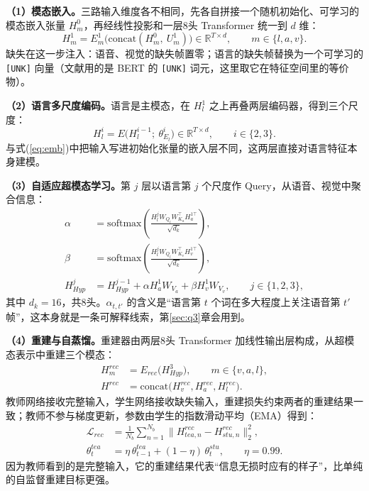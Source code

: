 \textbf{（1）模态嵌入。}三路输入维度各不相同，先各自拼接一个随机初始化、可学习的模态嵌入张量 $H_m^0$，再经线性投影和一层8头 Transformer 统一到 $d$ 维：
\begin{equation}\label{eq:emb}
H_m^1=E_m^1\big(\mathrm{concat}(H_m^0,\ U_m^1)\big)\in\mathbb{R}^{T\times d},\qquad m\in\{l,a,v\}.
\end{equation}
缺失在这一步注入：语音、视觉的缺失帧置零；语言的缺失帧替换为一个可学习的 \texttt{[UNK]} 向量（文献\cite{shi2026ldsd}用的是 BERT 的 \texttt{[UNK]} 词元，这里取它在特征空间里的等价物）。

\textbf{（2）语言多尺度编码。}语言是主模态，在 $H_l^1$ 之上再叠两层编码器，得到三个尺度：
\begin{equation}\label{eq:lang}
H_l^i=E\big(H_l^{i-1};\ \theta_{E_l}^i\big)\in\mathbb{R}^{T\times d},\qquad i\in\{2,3\}.
\end{equation}
与式(\ref{eq:emb})中把输入写进初始化张量的嵌入层不同，这两层直接对语言特征本身建模。

\textbf{（3）自适应超模态学习。}第 $j$ 层以语言第 $j$ 个尺度作 Query，从语音、视觉中聚合信息：
\begin{align}
\alpha&=\mathrm{softmax}\!\left(\frac{H_l^j W_{Q_l} W_{K_a}^{\top} H_a^{1\top}}{\sqrt{d_k}}\right),\label{eq:alpha}\\
\beta&=\mathrm{softmax}\!\left(\frac{H_l^j W_{Q_l} W_{K_v}^{\top} H_v^{1\top}}{\sqrt{d_k}}\right),\label{eq:beta}\\
H_{Hyp}^j&=H_{Hyp}^{j-1}+\alpha H_a^1 W_{V_a}+\beta H_v^1 W_{V_v},\qquad j\in\{1,2,3\},\label{eq:hyp}
\end{align}
其中 $d_k=16$，共8头。$\alpha_{t,t'}$ 的含义是“语言第 $t$ 个词在多大程度上关注语音第 $t'$ 帧”，这本身就是一条可解释线索，第\ref{sec:q3}章会用到。

\textbf{（4）重建与自蒸馏。}重建器由两层8头 Transformer 加线性输出层构成，从超模态表示中重建三个模态：
\begin{align}
H_m^{rec}&=E_{rec}\big(H_{Hyp}^3\big),\qquad m\in\{v,a,l\},\label{eq:rec}\\
H^{rec}&=\mathrm{concat}\big(H_v^{rec},H_a^{rec},H_l^{rec}\big).\label{eq:reccat}
\end{align}
教师网络接收完整输入，学生网络接收缺失输入，重建损失约束两者的重建结果一致；教师不参与梯度更新，参数由学生的指数滑动平均（EMA）得到\cite{tarvainen2017mean}：
\begin{align}
\mathcal{L}_{rec}&=\frac{1}{N_b}\sum_{n=1}^{N_b}\big\|H^{rec}_{tea,n}-H^{rec}_{stu,n}\big\|_2^2,\label{eq:lrec}\\
\theta_t^{tea}&=\eta\,\theta_{t-1}^{tea}+(1-\eta)\,\theta_t^{stu},\qquad \eta=0.99.\label{eq:ema}
\end{align}
因为教师看到的是完整输入，它的重建结果代表“信息无损时应有的样子”，比单纯的自监督重建目标更强\cite{hinton2015distilling}。

